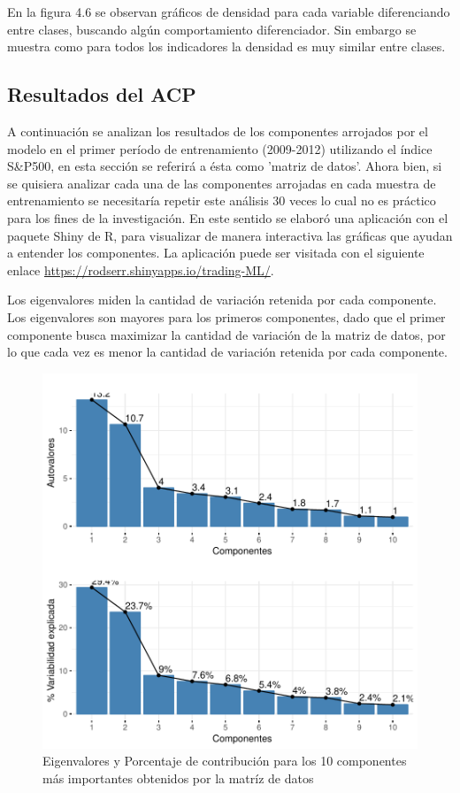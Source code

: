 \documentclass[a4paper,12pt]{Latex/Classes/PhDthesisPSnPDF}
\begin{document}
En la figura 4.6 se observan gráficos de densidad para cada variable diferenciando entre clases, buscando algún comportamiento diferenciador. Sin embargo se muestra como para todos los indicadores la densidad es muy similar entre clases.

\subsection{Resultados del ACP}

A continuación se analizan los resultados de los componentes arrojados por el modelo en el primer período de entrenamiento (2009-2012) utilizando el índice S\&P500, en esta sección se referirá a ésta como 'matriz de datos'. Ahora bien, si se quisiera analizar cada una de las componentes arrojadas en cada muestra de entrenamiento se necesitaría repetir este análisis 30 veces lo cual no es práctico para los fines de la investigación. En este sentido se elaboró una aplicación con el paquete Shiny de R, para visualizar de manera interactiva las gráficas que ayudan a entender los componentes. La aplicación puede ser visitada con el siguiente enlace \url{https://rodserr.shinyapps.io/trading-ML/}.


Los eigenvalores miden la cantidad de variación retenida por cada componente. Los eigenvalores son mayores para los primeros componentes, dado que el primer componente busca maximizar la cantidad de variación de la matriz de datos, por lo que cada vez es menor la cantidad de variación retenida por cada componente.

\begin{figure}[H]
\centering
\includegraphics{main-013}
\caption{Eigenvalores y Porcentaje de contribución para los 10 componentes más importantes obtenidos por la matríz de datos}
\end{figure}
\end{document}
